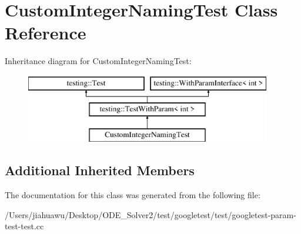 \hypertarget{class_custom_integer_naming_test}{}\section{Custom\+Integer\+Naming\+Test Class Reference}
\label{class_custom_integer_naming_test}
Inheritance diagram for Custom\+Integer\+Naming\+Test\+:\begin{figure}[H]
\begin{center}
\leavevmode
\includegraphics[height=3.000000cm]{class_custom_integer_naming_test}
\end{center}
\end{figure}
\subsection*{Additional Inherited Members}


The documentation for this class was generated from the following file\+:\begin{DoxyCompactItemize}
\item 
/\+Users/jiahuawu/\+Desktop/\+O\+D\+E\+\_\+\+Solver2/test/googletest/test/googletest-\/param-\/test-\/test.\+cc\end{DoxyCompactItemize}
